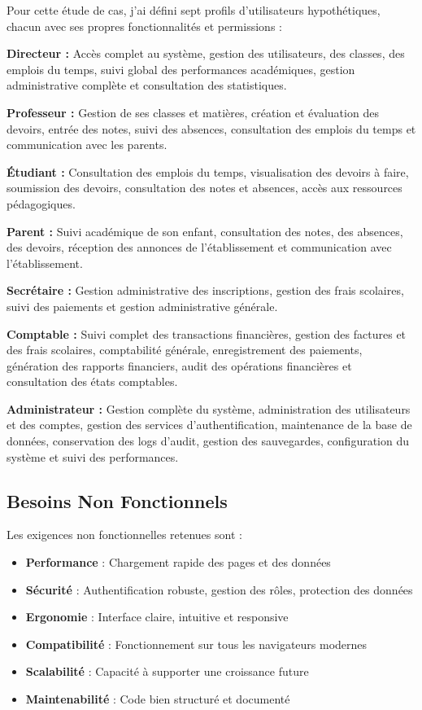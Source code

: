 \documentclass[12pt,a4paper]{report}
\begin{document}
    Pour cette étude de cas, j'ai défini sept profils d'utilisateurs hypothétiques, chacun avec ses propres fonctionnalités et permissions :

    \textbf{Directeur :} Accès complet au système, gestion des utilisateurs, des classes, des emplois du temps, suivi global des performances académiques, gestion administrative complète et consultation des statistiques.

    \textbf{Professeur :} Gestion de ses classes et matières, création et évaluation des devoirs, entrée des notes, suivi des absences, consultation des emplois du temps et communication avec les parents.

    \textbf{Étudiant :} Consultation des emplois du temps, visualisation des devoirs à faire, soumission des devoirs, consultation des notes et absences, accès aux ressources pédagogiques.

    \textbf{Parent :} Suivi académique de son enfant, consultation des notes, des absences, des devoirs, réception des annonces de l'établissement et communication avec l'établissement.

    \textbf{Secrétaire :} Gestion administrative des inscriptions, gestion des frais scolaires, suivi des paiements et gestion administrative générale.

    \textbf{Comptable :} Suivi complet des transactions financières, gestion des factures et des frais scolaires, comptabilité générale, enregistrement des paiements, génération des rapports financiers, audit des opérations financières et consultation des états comptables.

    \textbf{Administrateur :} Gestion complète du système, administration des utilisateurs et des comptes, gestion des services d'authentification, maintenance de la base de données, conservation des logs d'audit, gestion des sauvegardes, configuration du système et suivi des performances.

    \subsection{Besoins Non Fonctionnels}

    Les exigences non fonctionnelles retenues sont :

    \begin{itemize}
        \item \textbf{Performance} : Chargement rapide des pages et des données
        \item \textbf{Sécurité} : Authentification robuste, gestion des rôles, protection des données
        \item \textbf{Ergonomie} : Interface claire, intuitive et responsive
        \item \textbf{Compatibilité} : Fonctionnement sur tous les navigateurs modernes
        \item \textbf{Scalabilité} : Capacité à supporter une croissance future
        \item \textbf{Maintenabilité} : Code bien structuré et documenté
    \end{itemize}
\end{document}
